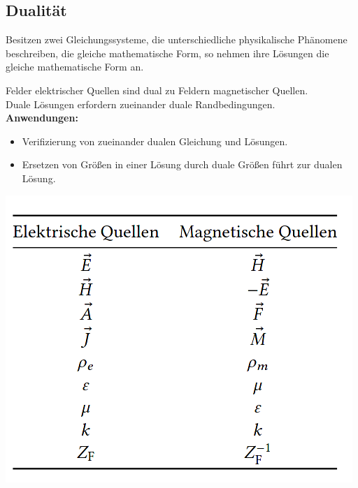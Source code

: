 \documentclass[english]{latex4ei/latex4ei_sheet}
\begin{document}
\begin{sectionbox}
	\subsection{Dualität}
	Besitzen zwei Gleichungssysteme, die unterschiedliche physikalische Phänomene beschreiben, die gleiche mathematische Form, so nehmen ihre Lösungen die gleiche mathematische Form an.

	Felder elektrischer Quellen sind dual zu Feldern magnetischer Quellen.\\
	Duale Lösungen erfordern zueinander duale Randbedingungen.\\
	\textbf{Anwendungen:}
	\begin{itemize}
		\item Verifizierung von zueinander dualen Gleichung und Lösungen.
		\item Ersetzen von Größen in einer Lösung durch duale Größen führt zur dualen Lösung.
	\end{itemize}
	\includegraphics[width=\textwidth]{./img/dualitaet_tabelle.png}
\end{sectionbox}
\end{document}

